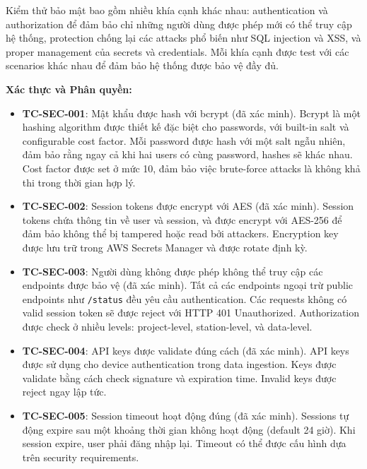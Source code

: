 Kiểm thử bảo mật bao gồm nhiều khía cạnh khác nhau: authentication và authorization để đảm bảo chỉ những người dùng được phép mới có thể truy cập hệ thống, protection chống lại các attacks phổ biến như SQL injection và XSS, và proper management của secrets và credentials. Mỗi khía cạnh được test với các scenarios khác nhau để đảm bảo hệ thống được bảo vệ đầy đủ.

\textbf{Xác thực và Phân quyền:}
\begin{itemize}
    \item \textbf{TC-SEC-001}: Mật khẩu được hash với bcrypt (đã xác minh). Bcrypt là một hashing algorithm được thiết kế đặc biệt cho passwords, với built-in salt và configurable cost factor. Mỗi password được hash với một salt ngẫu nhiên, đảm bảo rằng ngay cả khi hai users có cùng password, hashes sẽ khác nhau. Cost factor được set ở mức 10, đảm bảo việc brute-force attacks là không khả thi trong thời gian hợp lý.
    
    \item \textbf{TC-SEC-002}: Session tokens được encrypt với AES (đã xác minh). Session tokens chứa thông tin về user và session, và được encrypt với AES-256 để đảm bảo không thể bị tampered hoặc read bởi attackers. Encryption key được lưu trữ trong AWS Secrets Manager và được rotate định kỳ.
    
    \item \textbf{TC-SEC-003}: Người dùng không được phép không thể truy cập các endpoints được bảo vệ (đã xác minh). Tất cả các endpoints ngoại trừ public endpoints như \texttt{/status} đều yêu cầu authentication. Các requests không có valid session token sẽ được reject với HTTP 401 Unauthorized. Authorization được check ở nhiều levels: project-level, station-level, và data-level.
    
    \item \textbf{TC-SEC-004}: API keys được validate đúng cách (đã xác minh). API keys được sử dụng cho device authentication trong data ingestion. Keys được validate bằng cách check signature và expiration time. Invalid keys được reject ngay lập tức.
    
    \item \textbf{TC-SEC-005}: Session timeout hoạt động đúng (đã xác minh). Sessions tự động expire sau một khoảng thời gian không hoạt động (default 24 giờ). Khi session expire, user phải đăng nhập lại. Timeout có thể được cấu hình dựa trên security requirements.
\end{itemize}

